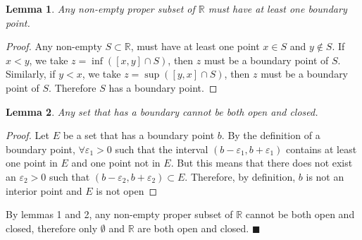 \documentclass[11pt]{article}
\def \R {\mathbb{R}}
\def \epsilon {\varepsilon}
\newtheorem{lemma}{Lemma}
\begin{document}
\begin{lemma}
	Any non-empty proper subset of $\R$ must have at least one boundary point. 
\end{lemma}

\begin{proof}
	Any non-empty $S \subset \R$, must have at least one point $x \in S$ and $y \notin S$. If $x < y$, we take $z = \inf([x, y]\cap S)$, then $z$ must be a boundary point of $S$. Similarly, if $y < x$, we take $z = \sup([y, x]\cap S)$, then $z$ must be a boundary point of $S$. Therefore $S$ has a boundary point.
\end{proof}

\begin{lemma}
	Any set that has a boundary cannot be both open and closed.
\end{lemma}

\begin{proof}
	Let $E$ be a set that has a boundary point $b$. By the definition of a boundary point, $\forall \epsilon_1 > 0$ such that the interval $(b - \epsilon_1, b + \epsilon_1)$ contains at least one point in $E$ and one point not in $E$. But this means that there does not exist an $\epsilon_2 > 0$ such that $(b - \epsilon_2, b + \epsilon_2) \subset E$. Therefore, by definition, $b$ is not an interior point and $E$ is not open
\end{proof}

By lemmas 1 and 2, any non-empty proper subset of $\R$ cannot be both open and closed, therefore only $\emptyset$ and $\R$ are both open and closed. 
$\blacksquare$
\end{document}
